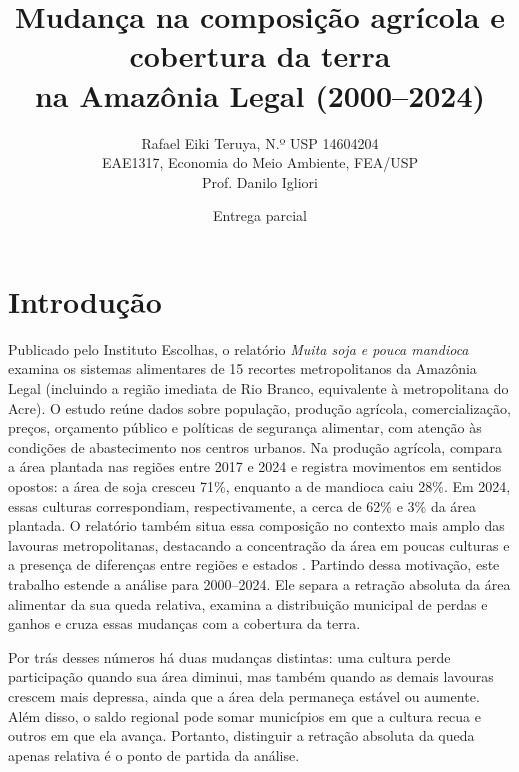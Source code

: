 \documentclass[11pt,a4paper]{article}
\begin{document}
\title{\bfseries Mudança na composição agrícola e cobertura da terra\\ na Amazônia Legal (2000–2024)}
\author{Rafael Eiki Teruya, N.º USP 14604204\\ {\small EAE1317, Economia do Meio Ambiente, FEA/USP}\\ {\small Prof. Danilo Igliori}}
\date{\small Entrega parcial}
\maketitle

\section{Introdução}

Publicado pelo Instituto Escolhas, o relatório \textit{Muita soja e pouca mandioca} examina os sistemas alimentares de 15 recortes metropolitanos da Amazônia Legal (incluindo a região imediata de Rio Branco, equivalente à metropolitana do Acre). O estudo reúne dados sobre população, produção agrícola, comercialização, preços, orçamento público e políticas de segurança alimentar, com atenção às condições de abastecimento nos centros urbanos. Na produção agrícola, compara a área plantada nas regiões entre 2017 e 2024 e registra movimentos em sentidos opostos: a área de soja cresceu 71\%, enquanto a de mandioca caiu 28\%. Em 2024, essas culturas correspondiam, respectivamente, a cerca de 62\% e 3\% da área plantada. O relatório também situa essa composição no contexto mais amplo das lavouras metropolitanas, destacando a concentração da área em poucas culturas e a presença de diferenças entre regiões e estados \citep{escolhas2026}. Partindo dessa motivação, este trabalho estende a análise para 2000–2024. Ele separa a retração absoluta da área alimentar da sua queda relativa, examina a distribuição municipal de perdas e ganhos e cruza essas mudanças com a cobertura da terra.

Por trás desses números há duas mudanças distintas: uma cultura perde participação quando sua área diminui, mas também quando as demais lavouras crescem mais depressa, ainda que a área dela permaneça estável ou aumente. Além disso, o saldo regional pode somar municípios em que a cultura recua e outros em que ela avança. Portanto, distinguir a retração absoluta da queda apenas relativa é o ponto de partida da análise.
\end{document}
